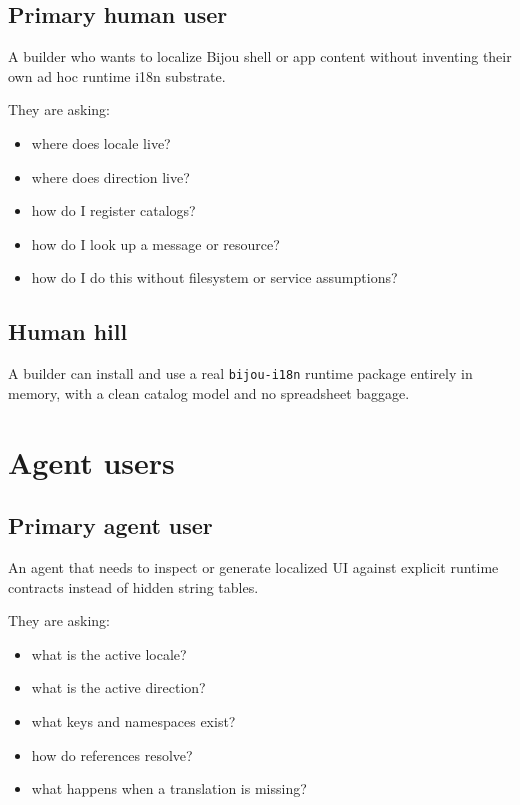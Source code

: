 \subsection{Primary human user}\label{record-188-primary-human-user}

A builder who wants to localize Bijou shell or app content without inventing their own ad hoc runtime i18n substrate.

They are asking:

\begin{itemize}
\tightlist
\item
  where does locale live?
\item
  where does direction live?
\item
  how do I register catalogs?
\item
  how do I look up a message or resource?
\item
  how do I do this without filesystem or service assumptions?
\end{itemize}

\subsection{Human hill}\label{record-188-human-hill}

A builder can install and use a real \texttt{b\allowbreak{}i\allowbreak{}j\allowbreak{}o\allowbreak{}u\allowbreak{}-\allowbreak{}i\allowbreak{}1\allowbreak{}8\allowbreak{}n} runtime package entirely in memory, with a clean catalog model and no spreadsheet baggage.

\section{Agent users}\label{record-188-agent-users}

\subsection{Primary agent user}\label{record-188-primary-agent-user}

An agent that needs to inspect or generate localized UI against explicit runtime contracts instead of hidden string tables.

They are asking:

\begin{itemize}
\tightlist
\item
  what is the active locale?
\item
  what is the active direction?
\item
  what keys and namespaces exist?
\item
  how do references resolve?
\item
  what happens when a translation is missing?
\end{itemize}


